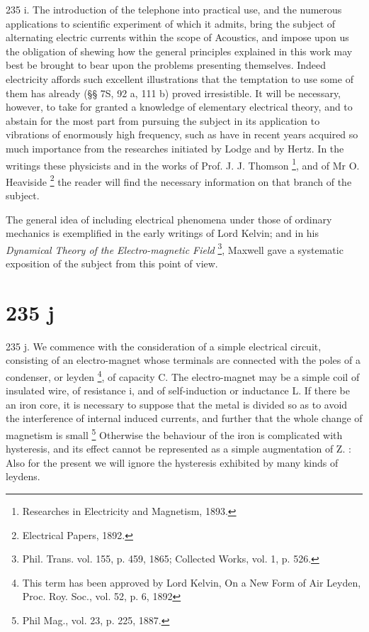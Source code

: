 235 i. The introduction of the telephone into practical use, and the numerous
applications to scientific experiment of which it admits, bring the subject of
alternating electric currents within the scope of Acoustics, and impose upon us
the obligation of shewing how the general principles explained in this work
may best be brought to bear upon the problems presenting themselves.  Indeed
electricity affords such excellent illustrations that the temptation to use
some of them has already (§§ 7S, 92 a, 111 b) proved irresistible. It will be
necessary, however, to take for granted a knowledge of elementary electrical
theory, and to abstain for the most part from pursuing the subject in its
application to vibrations of enormously high frequency, such as have in recent
years acquired so much importance from the researches initiated by Lodge and by
Hertz. In the writings these physicists and in the works of
Prof. J. J. Thomson \footnote{Researches in Electricity and Magnetism, 1893.},
and of Mr O. Heaviside \footnote{Electrical Papers, 1892.}
the reader will find the necessary information on that branch of the subject.

The general idea of including electrical phenomena under those of ordinary
mechanics is exemplified in the early writings of Lord Kelvin; and in his
\textit{Dynamical Theory of the Electro-magnetic Field}
\footnote{Phil. Trans. vol. 155, p. 459, 1865; Collected Works, vol. 1, p. 526.},
Maxwell gave a systematic exposition of the subject from this point of view.

\section{235 j}
235 j. We commence with the consideration of a simple electrical circuit,
consisting of an electro-magnet whose terminals are connected with the poles of
a condenser, or leyden
\footnote{This term has been approved by Lord Kelvin, On a New Form of Air
Leyden, Proc. Roy. Soc., vol. 52, p. 6, 1892},
of capacity C.  The electro-magnet may be a simple coil
of insulated wire, of resistance i, and of self-induction or inductance L. If
there be an iron core, it is necessary to suppose that the metal is divided so
as to avoid the interference of internal induced currents, and further that the
whole change of magnetism is small \footnote{Phil Mag., vol. 23, p. 225, 1887.}
Otherwise the behaviour of the iron is complicated with hysteresis, and its
effect cannot be represented as a simple augmentation of Z. : Also for the
present we will ignore the hysteresis exhibited by many kinds of leydens.

